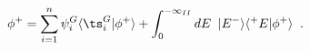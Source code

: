 \begin{equation}
\phi^+ = \sum^n_{i=1} \psi^G_i \langle \ts^G_i | \phi^+\rangle	+ 
\int^{-\infty_{II}}_0  dE \;\; |E^-\rangle	\langle^+E|\phi^+ \rangle  
\;\; .
\label{eq:spectresolution}
\end{equation}


